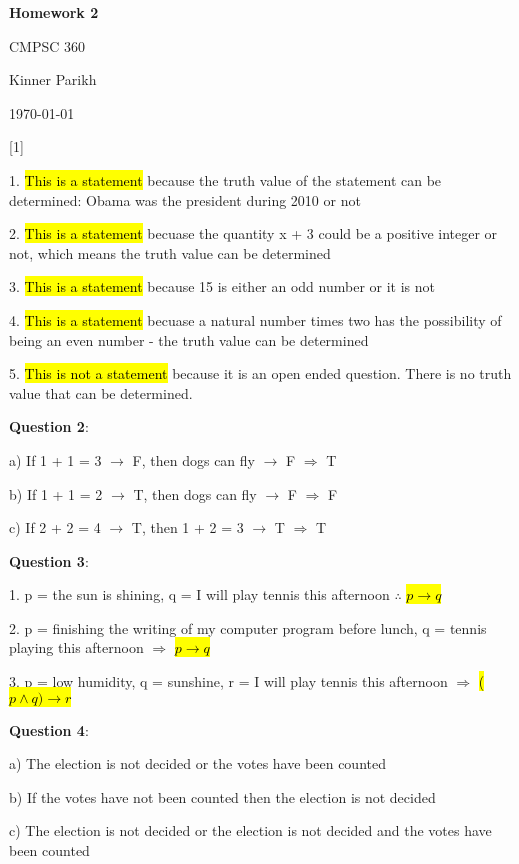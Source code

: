 \documentclass{article} %
\newcommand{\question}[2][]{\begin{flushleft}
        \textbf{Question #1}: \textit{#2}

\end{flushleft}}
\newcommand{\maketitletwo}[2][]{\begin{center}
        \Large{\textbf{Homework #1}
            
            CMPSC 360} %
        \vspace{5pt}
        
        \normalsize{Kinner Parikh  %
        
        \today}        %
        \vspace{15pt}
        
\end{center}}
\begin{document}
    \maketitletwo[2]  %
    
    \question[1]{}
    
        1. \hl{This is a statement} because the truth value of the statement can be determined: Obama was \tabto{1cm} the president during 2010 or not

        2. \hl{This is a statement} becuase the quantity x + 3 could be a positive integer or not, which \tabto{1cm} means the truth value can be determined

        3. \hl{This is a statement} because 15 is either an odd number or it is not

        4. \hl{This is a statement} becuase a natural number times two has the possibility of being an even \tabto{1cm} number - the truth value can be determined

        5. \hl{This is not a statement} because it is an open ended question. There is no truth value that \tabto{1cm} can be determined.

    \question[2]{}

        a) If 1 + 1 = 3 $\rightarrow$ F, then dogs can fly $\rightarrow$ F $\Rightarrow$  T

        b) If 1 + 1 = 2 $\rightarrow$ T, then dogs can fly $\rightarrow$ F $\Rightarrow$  F

        c) If 2 + 2 = 4 $\rightarrow$ T, then 1 + 2 = 3 $\rightarrow$ T $\Rightarrow$ T

    \question[3]{}

        1. p = the sun is shining, q = I will play tennis this afternoon $\therefore$ \hl{$p \rightarrow q$}

        2. p = finishing the writing of my computer program before lunch, q = tennis playing this \tabto{0.96cm} afternoon $\Rightarrow$ \hl{$p \rightarrow q$}

        3. p = low humidity, q = sunshine, r = I will play tennis this afternoon $\Rightarrow$ \hl{($p \land q) \rightarrow r$}
    
    \question[4]{}

        a) The election is not decided or the votes have been counted

        b) If the votes have not been counted then the election is not decided

        c) The election is not decided or the election is not decided and the votes have been counted
\end{document}
